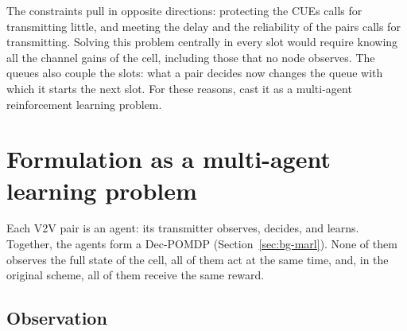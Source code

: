 The constraints pull in opposite directions: protecting the \acp{CUE} calls for transmitting little, and
meeting the delay and the reliability of the pairs calls for transmitting. Solving this problem centrally
in every slot would require knowing all the channel gains of the cell, including those that no node
observes. The queues also couple the slots: what a pair decides now changes the queue with which it starts
the next slot. For these reasons, \citet{li+22fedmarl} cast it as a multi-agent reinforcement learning
problem.

\section{Formulation as a multi-agent learning problem}
\label{sec:sm-formulation}

Each \ac{V2V} pair is an agent: its transmitter observes, decides, and learns. Together, the agents form a
\ac{Dec-POMDP} (Section~\ref{sec:bg-marl}). None of them observes the full state of the cell, all of them
act at the same time, and, in the original scheme, all of them receive the same reward.

\subsection{Observation}
\label{sec:sm-observation}

